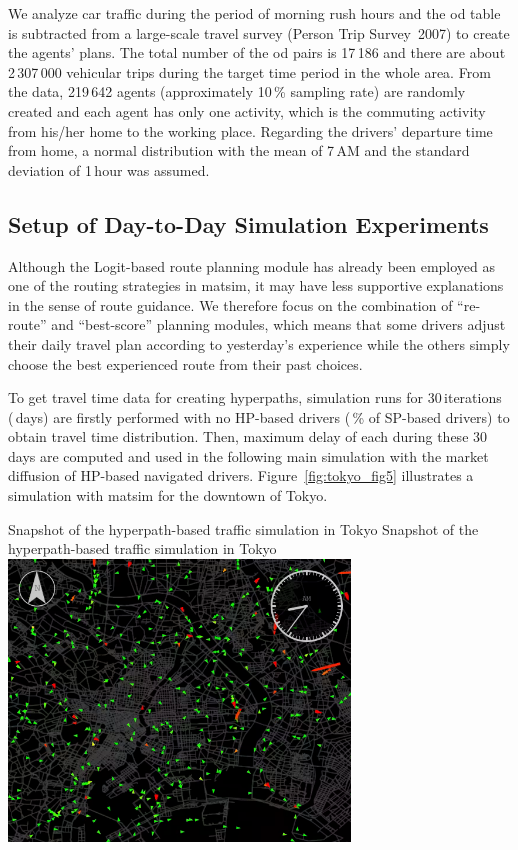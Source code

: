 We analyze car traffic during the period of morning rush hours and the \gls{od} table is subtracted from a large-scale travel survey (Person Trip Survey~2007) to create the agents' plans. The total number of the \gls{od} pairs is 17\,186 and there are about 2\,307\,000 vehicular trips during the target time period in the whole area. From the data, 219\,642 agents (approximately 10\,\% sampling rate) are randomly created and each agent has only one activity, which is the commuting activity from his/her home to the working place. Regarding the drivers' departure time from home, a normal distribution with the mean of 7\,AM and the standard deviation of 1\,hour was assumed.

\subsection{Setup of Day-to-Day Simulation Experiments}
Although the Logit-based route planning module has already been employed as one of the routing strategies in \gls{matsim}, it may have less supportive explanations in the sense of route guidance. We therefore focus on the combination of ``re-route'' and ``best-score'' planning modules, which means that some drivers adjust their daily travel plan according to yesterday's experience while the others simply choose the best experienced route from their past choices. 

To get travel time data for creating hyperpaths, simulation runs for 30\,iterations (\,days) are firstly performed with no HP-based drivers (\,\% of SP-based drivers) to obtain travel time distribution. Then, maximum delay of each during these 30\,days are computed and used in the following main simulation with the market diffusion of HP-based navigated drivers. Figure~\ref{fig:tokyo_fig5} illustrates a simulation with \gls{matsim} for the downtown of Tokyo. 

\createfigure%
{Snapshot of the hyperpath-based traffic simulation in Tokyo}%
{Snapshot of the hyperpath-based traffic simulation in Tokyo}%
{\label{fig:tokyo_fig5}}%
{\includegraphics[width=0.68\textwidth, angle=0]{./scenarios/figures/tokyo_fig5.png}}%
{}

